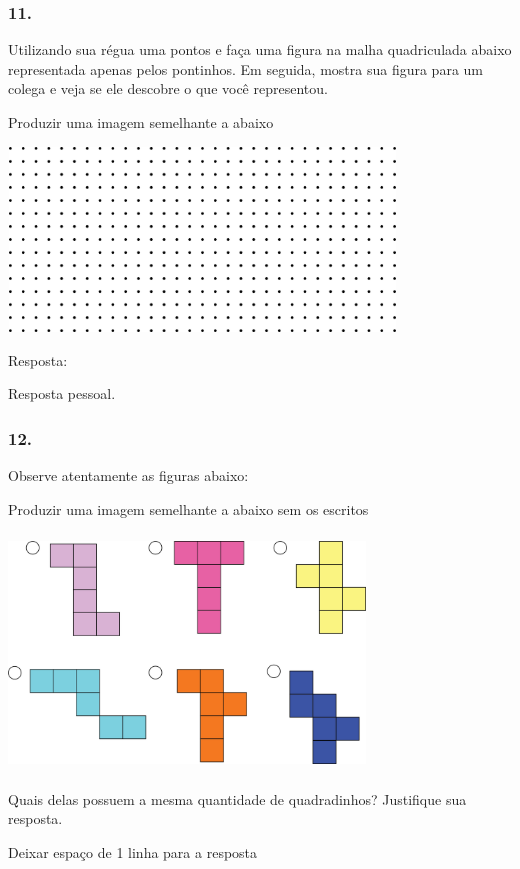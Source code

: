 \subsubsection{11.}\label{section-74}

Utilizando sua régua uma pontos e faça uma figura na malha quadriculada
abaixo representada apenas pelos pontinhos. Em seguida, mostra sua
figura para um colega e veja se ele descobre o que você representou.

Produzir uma imagem semelhante a abaixo

\includegraphics[width=4.05869in,height=1.93350in]{media/image58.png}

Resposta:

Resposta pessoal.

\subsubsection{12.}\label{section-75}

Observe atentamente as figuras abaixo:

Produzir uma imagem semelhante a abaixo sem os escritos

\includegraphics[width=3.72532in,height=2.47521in]{media/image59.png}

Quais delas possuem a mesma quantidade de quadradinhos? Justifique sua
resposta.

Deixar espaço de 1 linha para a resposta


